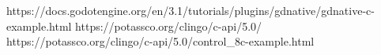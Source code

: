 


https://docs.godotengine.org/en/3.1/tutorials/plugins/gdnative/gdnative-c-example.html
https://potassco.org/clingo/c-api/5.0/
https://potassco.org/clingo/c-api/5.0/control_8c-example.html
